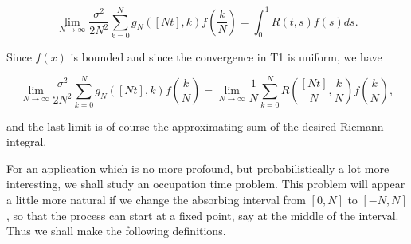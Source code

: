$$\lim_{N \to \infty} \frac{\sigma^2}{2N^2} \sum_{k=0}^{N} g_N([Nt],k)f\left(\frac{k}{N}\right) = \int_0^1 R(t,s)f(s)ds.$$

Since $f(x)$ is bounded and since the convergence in T1 is uniform, we have

$$\lim_{N \to \infty} \frac{\sigma^2}{2N^2} \sum_{k=0}^{N} g_N([Nt],k)f\left(\frac{k}{N}\right) = \lim_{N \to \infty} \frac{1}{N} \sum_{k=0}^{N} R\left(\frac{[Nt]}{N},\frac{k}{N}\right)f\left(\frac{k}{N}\right),$$

and the last limit is of course the approximating sum of the desired Riemann integral.

For an application which is no more profound, but probabilistically a lot more interesting, we shall study an occupation time problem. This problem will appear a little more natural if we change the absorbing interval from $[0,N]$ to $[-N,N]$, so that the process can start at a fixed point, say at the middle of the interval. Thus we shall make the following definitions.